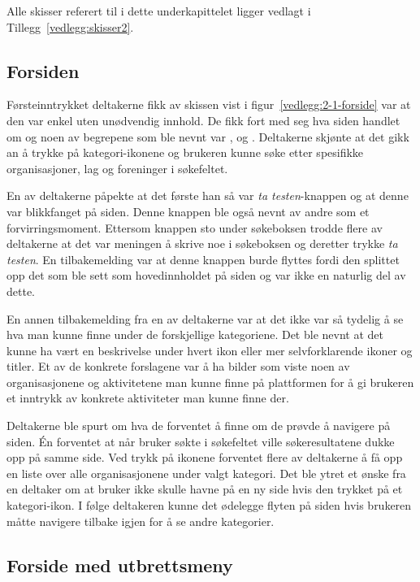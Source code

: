 Alle skisser referert til i dette underkapittelet ligger vedlagt i Tillegg~\ref{vedlegg:skisser2}.

\subsection{Forsiden}

Førsteinntrykket deltakerne fikk av skissen vist i figur~\ref{vedlegg:2-1-forside} 
var at den var enkel uten unødvendig innhold. De fikk fort med seg hva siden handlet om og noen av begrepene som ble nevnt var ,  og . Deltakerne skjønte at det gikk an å trykke på kategori-ikonene og brukeren kunne søke etter spesifikke organisasjoner, lag og foreninger i søkefeltet.

En av deltakerne påpekte at det første han så var {\em ta testen}-knappen og at denne var blikkfanget på siden. Denne knappen ble også nevnt av andre som et forvirringsmoment. Ettersom knappen sto under søkeboksen trodde flere av deltakerne at det var meningen å skrive noe i søkeboksen og deretter trykke {\em ta testen}. En tilbakemelding var at denne knappen burde flyttes fordi den splittet opp det som ble sett som hovedinnholdet på siden og var ikke en naturlig del av dette.

En annen tilbakemelding fra en av deltakerne var at det ikke var så tydelig å se hva man kunne finne under de forskjellige kategoriene. Det ble nevnt at det kunne ha vært en beskrivelse under hvert ikon eller mer selvforklarende ikoner og titler. Et av de konkrete forslagene var å ha bilder som viste noen av organisasjonene og aktivitetene man kunne finne på plattformen for å gi brukeren et inntrykk av konkrete aktiviteter man kunne finne der.

Deltakerne ble spurt om hva de forventet å finne om de prøvde å navigere på siden. Én forventet at når bruker søkte i søkefeltet ville søkeresultatene dukke opp på samme side. Ved trykk på ikonene forventet flere av deltakerne å få opp en liste over alle organisasjonene under valgt kategori. Det ble ytret et ønske fra en deltaker om at bruker ikke skulle havne på en ny side hvis den trykket på et kategori-ikon. I følge deltakeren kunne det ødelegge flyten på siden hvis brukeren måtte navigere tilbake igjen for å se andre kategorier.


\subsection{Forside med utbrettsmeny}

